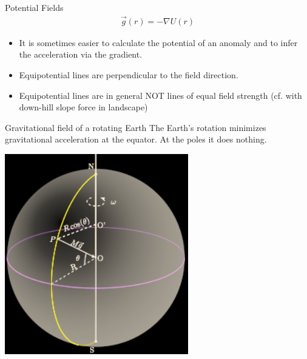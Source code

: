 \begin{frame}
  \begin{PointSix}{Potential Fields}
    \begin{align*}
      \vec{g}(r) = -\nabla U(r)
    \end{align*}
    \small
    \begin{itemize}
      \item It is sometimes easier to calculate the potential of an anomaly and to infer the acceleration via the gradient.
      \item Equipotential lines are perpendicular to the field direction.
      \item Equipotential lines are in general NOT lines of equal field strength (cf. with down-hill slope force in landscape)
    \end{itemize}
  \end{PointSix}
\end{frame}


\begin{frame}
\begin{PointSix}{Gravitational field of a rotating Earth}
  \small The Earth's rotation minimizes gravitational acceleration at the equator. At the poles it does nothing.
  \begin{center}
  \includegraphics[width=0.6\textwidth]{Figures/Gravity/Exported/GravityFieldEarthRotation_Reversed.png}
  \end{center}
\end{PointSix}
\end{frame}




